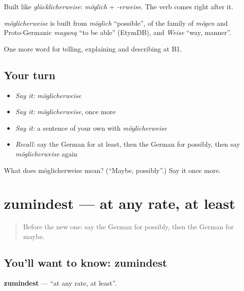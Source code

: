 Built like \emph{glücklicherweise}: \emph{möglich} + \emph{-erweise}. The verb comes right after it.

\begin{cousinweb}
\emph{möglicherweise} is built from \emph{möglich} \textquotedblleft{}possible\textquotedblright{}, of the family of \emph{mögen} and Proto-Germanic \emph{maganą} \textquotedblleft{}to be able\textquotedblright{} (EtymDB), and \emph{Weise} \textquotedblleft{}way, manner\textquotedblright{}.
\end{cousinweb}

\begin{grammarlens}[title={What you've built}]
One more word for telling, explaining and describing at B1.
\end{grammarlens}

\subsection*{Your turn}
\begin{itemize}
\raggedright
  \item \emph{Say it:} \emph{möglicherweise}
  \item \emph{Say it:} \emph{möglicherweise}, once more
  \item \emph{Say it:} a sentence of your own with \emph{möglicherweise}
  \item \emph{Recall:} say the German for at least, then the German for possibly, then say \emph{möglicherweise} again
\end{itemize}

\begin{tcolorbox}[breakable,colback=teal!4,colframe=teal!35!black,title={Before you move on}]
What does möglicherweise mean? (\textquotedblleft{}Maybe, possibly\textquotedblright{}.) Say it once more.
\end{tcolorbox}
\section[zumindest]{zumindest — at any rate, at least}

\label{lesson:GE-C367-zumindest}



\begin{quote}
Before the new one: say the German for possibly, then the German for maybe.
\end{quote}

\subsection*{You'll want to know: zumindest}
\textbf{zumindest} — \textquotedblleft{}at any rate, at least\textquotedblright{}.

